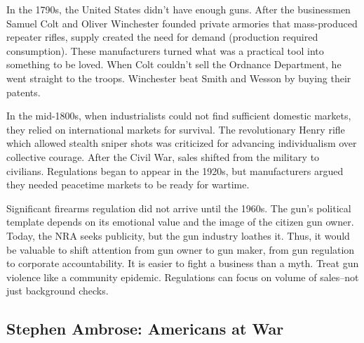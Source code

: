 \documentclass[
]{article}
\begin{document}
In the 1790s, the United States didn't have enough guns. After the
businessmen Samuel Colt and Oliver Winchester founded private armories
that mass-produced repeater rifles, supply created the need for demand
(production required consumption). These manufacturers turned what was a
practical tool into something to be loved. When Colt couldn't sell the
Ordnance Department, he went straight to the troops. Winchester beat
Smith and Wesson by buying their patents.

In the mid-1800s, when industrialists could not find sufficient domestic
markets, they relied on international markets for survival. The
revolutionary Henry rifle which allowed stealth sniper shots was
criticized for advancing individualism over collective courage. After
the Civil War, sales shifted from the military to civilians. Regulations
began to appear in the 1920s, but manufacturers argued they needed
peacetime markets to be ready for wartime.

Significant firearms regulation did not arrive until the 1960s. The
gun's political template depends on its emotional value and the image of
the citizen gun owner. Today, the NRA seeks publicity, but the gun
industry loathes it. Thus, it would be valuable to shift attention from
gun owner to gun maker, from gun regulation to corporate accountability.
It is easier to fight a business than a myth. Treat gun violence like a
community epidemic. Regulations can focus on volume of sales--not just
background checks.

\hypertarget{stephen-ambrose-americans-at-war}{%
\subsection{Stephen Ambrose: Americans at
War}\label{stephen-ambrose-americans-at-war}}
\end{document}
